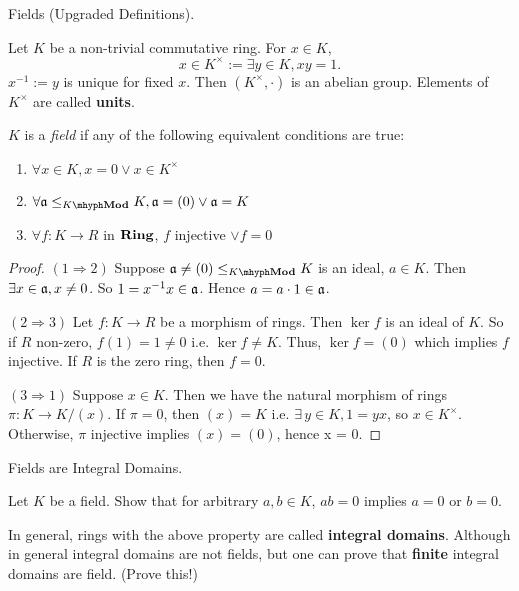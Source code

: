 \documentclass[../book.tex]{subfiles}
\begin{document}
\begin{dfn} Fields (Upgraded Definitions).

    Let $K$ be a non-trivial commutative ring. 
    For $x \in K$, 
    \[
        x \in K^\times := \exists y \in K, xy = 1. 
    \]
    $x^{-1} := y$ is unique for fixed $x$. 
    Then $(K^\times, \cdot)$ is an abelian group. 
    Elements of $K^\times$ are called \textbf{units}. 

    $K$ is a \emph{field} if any of the following equivalent conditions are true:
    \begin{enumerate}
        \item $\forall x \in K, x = 0 \lor x \in K^\times$
        \item $\forall \fa \leq_{\mod{K}} K, \fa = (0) \lor \fa = K$
        \item $\forall f : K \to R$ in $\mathbf{Ring}$, $f$ injective $\lor f = 0$
    \end{enumerate}
\end{dfn}
\begin{proof} 
    $(1 \Rightarrow  2)$
    Suppose $\fa \neq (0) \leq_{\mod{K}} K$ is an ideal, $a \in K$. 
    Then $\exists x \in \mathfrak{a}, x \neq 0$.
    So $1 = x^{-1} x \in \mathfrak{a}$. 
    Hence $a = a\cdot1 \in \mathfrak{a}$. 

    $(2 \Rightarrow 3)$ 
    Let $f : K \to R$ be a morphism of rings. 
    Then $\ker f$ is an ideal of $K$. 
    So if $R$ non-zero, $f(1) = 1 \neq 0$ i.e. $\ker f \neq K$. 
    Thus, $\ker f = (0)$ which implies $f$ injective.  
    If $R$ is the zero ring, then $f = 0$. 

    $(3 \Rightarrow 1)$ 
    Suppose $x \in K$. 
    Then we have the natural morphism of rings $\pi : K \to K/(x)$. 
    If $\pi = 0$, then $(x) = K$ i.e. $\exists\,y \in K, 1 = yx$,
    so $x \in K^\times$. 
    Otherwise, $\pi$ injective implies $(x) = (0)$, hence x = 0. 
\end{proof}

\begin{ex} [Important] Fields are Integral Domains.
    
    Let $K$ be a field. 
    Show that for arbitrary $a, b \in K$, $ab = 0$ implies $a = 0$ or $b = 0$.
    
    In general, rings with the above property are called \textbf{integral domains}. 
    Although in general integral domains are not fields, 
    but one can prove that \textbf{finite} integral domains are field. 
    (Prove this!)
\end{ex}
\end{document}
